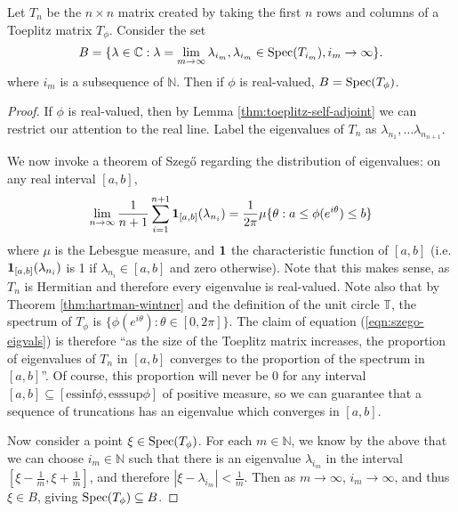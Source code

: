 \documentclass[../main.tex]{subfiles}
\begin{document}
\begin{theorem}
Let $T_n$ be the $n \times n$ matrix created by taking the first $n$ rows and
columns of a Toeplitz matrix $T_\phi$. Consider the set $$B =
\{\lambda \in \mathbb{C} : \lambda = \lim_{m \rightarrow \infty}
\lambda_{i_m}, \lambda_{i_m} \in \mathrm{Spec}(T_{i_m}), i_m \rightarrow \infty
\}.$$
where $i_m$ is a subsequence of $\mathbb{N}$. Then if $\phi$ is real-valued, $B = \mathrm{Spec}(T_\phi)$.
\end{theorem}
\begin{proof}
If $\phi$ is real-valued, then by Lemma \ref{thm:toeplitz-self-adjoint} we can
restrict our attention to the real line. Label the eigenvalues of $T_n$
as $\lambda_{n_1}, \hdots \lambda_{n_{n+1}}$. 
 
We now invoke a theorem of Szeg\H{o} \cite{grenander2001toeplitz} regarding the
distribution of eigenvalues: on any real interval $[a, b]$,
\begin{equation}
\label{eqn:szego-eigvals}
\lim_{n \rightarrow \infty} \frac{1}{n+1} \sum_{i=1}^{n+1} \mathbf{1}_{[a, b]}(\lambda_{n_i}) 
= \frac{1}{2 \pi} \mu\{\theta : a \leq \phi(e^{i \theta}) \leq b\}
\end{equation}
where $\mu$ is the Lebesgue measure, and $\mathbf{1}$ the characteristic function of $[a,b]$ 
(i.e. $\mathbf{1}_{[a, b]}(\lambda_{n_i})$ is 1 if $\lambda_{n_i} \in [a, b]$ and zero
otherwise). Note that this makes sense, as $T_n$ is Hermitian and
therefore every eigenvalue is real-valued. Note also that by Theorem
\ref{thm:hartman-wintner} and the definition of the unit circle
$\mathbb{T}$,
the spectrum of $T_\phi$ is $\{\phi(e^{i \theta}): \theta \in [0, 2\pi]\}$. The
claim of equation (\ref{eqn:szego-eigvals}) is therefore ``as the size
of the Toeplitz matrix increases, the proportion of eigenvalues of $T_n$
in $[a, b]$ converges to the proportion of the spectrum in $[a, b]$''. 
Of course, this proportion will never be 0 for any interval $[a, b] \subseteq
[\textrm{essinf}\phi, \textrm{esssup}\phi]$ of positive measure, so we
can guarantee that a sequence of truncations has an eigenvalue which
converges in $[a, b]$. 

Now consider a point $\xi \in \mathrm{Spec}(T_\phi)$. For each $m \in \mathbb{N}$, we
know by the above that we can choose $i_m \in \mathbb{N}$ such that
there is an eigenvalue $\lambda_{i_m}$ in the interval $[\xi -
\frac{1}{m}, \xi + \frac{1}{m}]$, and therefore $|\xi - \lambda_{i_m}| <
\frac{1}{m}$. Then as $m \rightarrow \infty$, $i_m \rightarrow \infty$,
and thus $\xi \in B$, giving $\mathrm{Spec}(T_\phi) \subseteq B$.


\end{proof}
\end{document}
